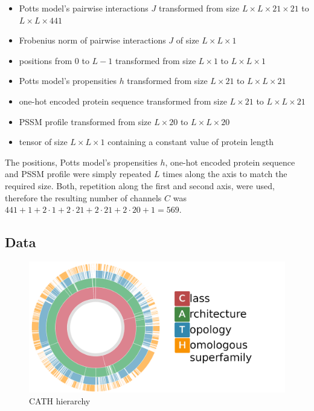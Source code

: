 \begin{itemize}
    \item Potts model's pairwise interactions $J$ transformed from size $L \times L \times 21 \times 21$ to $L \times L \times 441$
    \item Frobenius norm of pairwise interactions $J$ of size $L \times L \times 1$
    \item positions from $0$ to $L-1$ transformed from size $L \times 1$ to $L \times L \times 1$
    \item Potts model's propensities $h$ transformed from size $L \times 21$ to $L \times L \times 21$
    \item one-hot encoded protein sequence transformed from size $L \times 21$ to $L \times L \times 21$
    \item PSSM profile transformed from size $L \times 20$ to $L \times L \times 20$
    \item tensor of size $L \times L \times 1$ containing a constant value of protein length
\end{itemize}

The positions, Potts model's propensities $h$, one-hot encoded protein sequence and PSSM profile were simply repeated $L$ times along the axis to match the required size.
Both, repetition along the first and second axis, were used, therefore the resulting number of channels $C$ was $441 + 1 + 2 \cdot 1 + 2 \cdot 21 + 2 \cdot 21 + 2 \cdot 20 + 1 = 569$. 

\subsection{Data}

\begin{figure}
    \centering
    \includegraphics[width=\linewidth]{imgs_tomas/cath.png}
    \caption{CATH hierarchy \cite{cath}}
    \label{fig:cath}
\end{figure}

